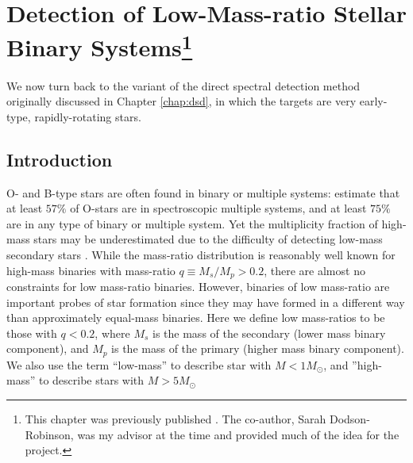 

\chapter{Detection of Low-Mass-ratio Stellar Binary Systems\footnote{
  This chapter was previously published \citep{Gullikson2013_2}. The co-author, Sarah Dodson-Robinson, was my advisor at the time and provided much of the idea for the project.
}}
\label{chap:pilot}
We now turn back to the variant of the direct spectral detection method originally discussed in Chapter \ref{chap:dsd}, in which the targets are very early-type, rapidly-rotating stars. 


\section{Introduction}
O- and B-type stars are often found in binary or
multiple systems: \cite{Mason2009} estimate that at least $57\%$ of O-stars are
in spectroscopic multiple systems, and at least $75\%$ are in any type of binary or multiple system.
Yet the multiplicity fraction of high-mass stars may be underestimated due to the difficulty of detecting low-mass secondary stars \citep{Sana2011}.  While the mass-ratio distribution
is reasonably well known for high-mass binaries with mass-ratio $q \equiv M_s/M_p > 0.2$, there are almost no
constraints for low mass-ratio binaries. However, binaries of low mass-ratio are important probes of star formation since they may have
formed in a different way than approximately equal-mass binaries. Here we define low mass-ratios to be 
those with $q < 0.2$, where $M_s$ is the mass of the secondary (lower mass binary component), and $M_p$ 
is the mass of the primary (higher mass binary component). We also use the term ``low-mass'' to 
describe star with $M < 1 M_{\odot}$, and ''high-mass'' to describe stars with $M > 5 
M_{\odot}$


